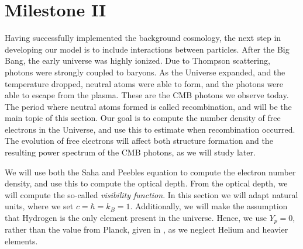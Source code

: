 \section{Milestone II}\label{M2}
Having successfully implemented the background cosmology, the next step in 
developing our model is to include interactions between particles. After the Big Bang, the early universe was highly ionized. Due to Thompson scattering, photons were strongly coupled to baryons. As the Universe expanded, and the temperature dropped, neutral atoms were able to form, and the photons were able to escape from the plasma. These are the CMB photons we observe today. The period where neutral atoms formed is called recombination, and will be the main topic of this section. Our goal is to compute the number density of free electrons in the Universe, and use this to estimate when recombination occurred. The evolution of free electrons will affect both structure formation and the resulting power spectrum of the CMB photons, as we will study later.

We will use both the Saha and Peebles equation to compute the electron number density, and use this to compute the optical depth. From the optical depth, we will compute the so-called \textit{visibility function}. In this section we will adapt natural units, where we set $c=\hbar=k_B=1$. Additionally, we will make the assumption that Hydrogen is the only element present in the universe. Hence, we use $Y_p=0$, rather than the value from Planck, given in 
, as we neglect Helium and heavier elements. 





 